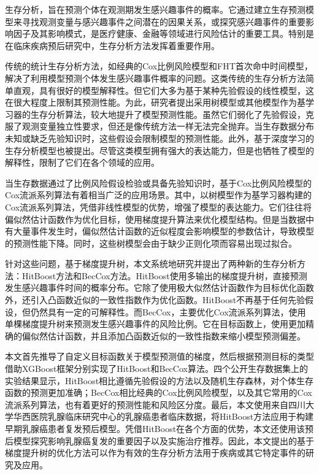 	
\begin{chineseabstract}
    生存分析，旨在预测个体在观测期发生感兴趣事件的概率。它通过建立生存预测模型来寻找观测变量与感兴趣事件之间潜在的因果关系，或探究感兴趣事件的重要影响因子及其影响模式，是医疗健康、金融等领域进行风险估计的重要工具。特别是在临床疾病预后研究中，生存分析方法发挥着重要作用。

    传统的统计生存分析方法，如经典的Cox比例风险模型和FHT首次命中时间模型，解决了利用模型预测个体发生感兴趣事件概率的问题。这类传统的生存分析方法简单直观，具有很好的模型解释性。但它们大多为基于某种先验假设的线性模型，这在很大程度上限制其预测性能。为此，研究者提出采用树模型或其他模型作为基学习器的生存分析算法，较大地提升了模型预测性能。虽然它们弱化了先验假设，克服了观测变量独立性要求，但还是像传统方法一样无法完全抛弃。当生存数据分布未知或缺乏先验知识时，这些假设会限制模型的预测性能。此外，基于深度学习的生存分析模型也被提出。尽管这类模型拥有强大的表达能力，但是也牺牲了模型的解释性，限制了它们在各个领域的应用。

    当生存数据通过了比例风险假设检验或具备先验知识时，基于Cox比例风险模型的Cox流派系列算法有着相当广泛的应用场景。其中，以树模型作为基学习器构建的Cox流派系列算法，凭借非线性模型的优势，增强了模型的表达能力。它们往往将偏似然估计函数作为优化目标，使用梯度提升算法来优化模型结构。但是当数据中有大量事件发生时，偏似然估计函数的近似程度会影响模型的参数估计，导致模型的预测性能下降。同时，这些树模型会由于缺少正则化项而容易出现过拟合。

    针对这些问题，基于梯度提升树，本文系统地研究并提出了两种新的生存分析方法：HitBoost方法和BecCox方法。HitBoost使用多输出的梯度提升树，直接预测发生感兴趣事件时间的概率分布。它除了使用极大似然估计函数作为目标优化函数外，还引入凸函数近似的一致性指数作为优化函数。HitBoost不再基于任何先验假设，但仍然具有一定的可解释性。而BecCox，主要优化Cox流派系列算法，使用单棵梯度提升树来预测发生感兴趣事件的风险比例。它在目标函数上，使用更加精确的偏似然估计函数，并且添加凸函数近似的一致性指数来缩小模型预测偏差。

    本文首先推导了自定义目标函数关于模型预测值的梯度，然后根据预测目标的类型借助XGBoost框架分别实现了HitBoost和BecCox算法。四个公开生存数据集上的实验结果显示，HitBoost相比遵循先验假设的方法以及随机生存森林，对个体生存函数的预测更加准确；BecCox相比经典的Cox比例风险模型，以及其它常用的Cox流派系列算法，也有着更好的预测性能和风险区分度。最后，本文使用来自四川大学华西医院乳腺临床研究中心的乳腺癌患者临床数据，将HitBoost方法应用于构建早期乳腺癌患者复发预后模型。凭借HitBoost在各个方面的优势，本文还使用该预后模型探究影响乳腺癌复发的重要因子以及实施治疗推荐。因此，本文提出的基于梯度提升树的优化方法可以作为有效的生存分析方法用于疾病或其它特定事件的研究及应用。

\end{chineseabstract}

